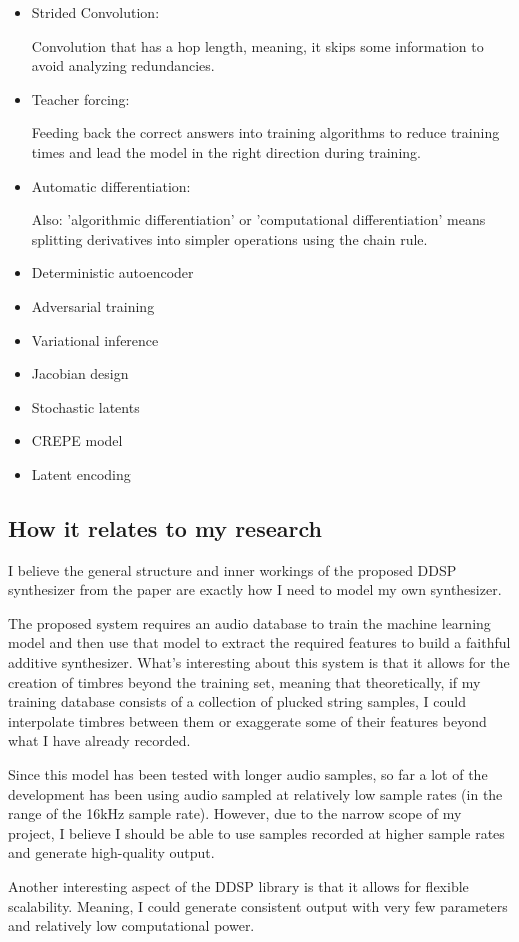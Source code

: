 \begin{itemize}
    \item Strided Convolution:
    
    Convolution that has a hop length, meaning, it skips some information
    to avoid analyzing redundancies.

    \item Teacher forcing:
    
    Feeding back the correct answers into training algorithms 
    to reduce training times and lead the model in the right direction during training.

    \item Automatic differentiation:
    
    Also: 'algorithmic differentiation' or 'computational differentiation' means splitting
    derivatives into simpler operations using the chain rule.

    \item Deterministic autoencoder
    \item Adversarial training
    \item Variational inference
    \item Jacobian design
    \item Stochastic latents
    \item CREPE model
    \item Latent encoding
\end{itemize}

\subsection{How it relates to my research}

I believe the general structure and inner workings of the proposed DDSP synthesizer from the paper
are exactly how I need to model my own synthesizer.

The proposed system requires an audio database to train the machine learning model
and then use that model to extract the required features to build a faithful additive
synthesizer. What's interesting about this system is that it allows for the creation
of timbres beyond the training set, meaning that theoretically, if my training database
consists of a collection of plucked string samples, I could interpolate timbres between them
or exaggerate some of their features beyond what I have already recorded.

Since this model has been tested with longer audio samples,
so far a lot of the development has been using audio sampled at 
relatively low sample rates (in the range of the 16kHz sample rate).
However, due to the narrow scope of my project, I believe I should be able to use
samples recorded at higher sample rates and generate high-quality output.

Another interesting aspect of the DDSP library is that it allows for 
flexible scalability. Meaning, I could generate consistent output with very few
parameters and relatively low computational power.